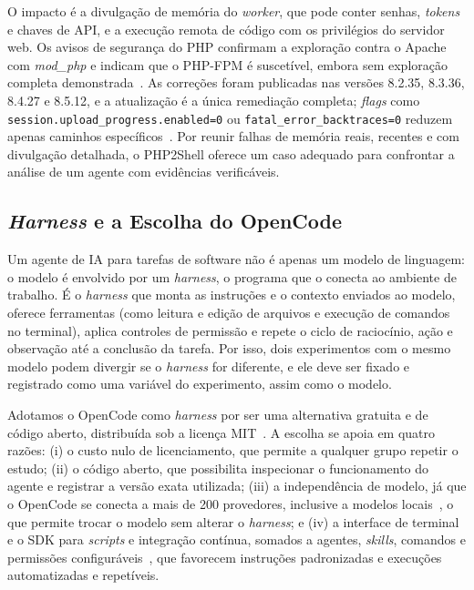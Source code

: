 \documentclass[12pt]{article}
\begin{document}
O impacto é a divulgação de memória do \textit{worker}, que pode conter senhas, \textit{tokens} e chaves de API, e a execução remota de código com os privilégios do servidor web. Os avisos de segurança do PHP confirmam a exploração contra o Apache com \textit{mod\_php} e indicam que o PHP-FPM é suscetível, embora sem exploração completa demonstrada~\cite{php2026ghsaw8hw, php2026ghsa6wmf}. As correções foram publicadas nas versões 8.2.35, 8.3.36, 8.4.27 e 8.5.12, e a atualização é a única remediação completa; \textit{flags} como \texttt{session.upload\_progress.enabled=0} ou \texttt{fatal\_error\_backtraces=0} reduzem apenas caminhos específicos~\cite{php2026ghsa6wmf}. Por reunir falhas de memória reais, recentes e com divulgação detalhada, o PHP2Shell oferece um caso adequado para confrontar a análise de um agente com evidências verificáveis.

\subsection{\textit{Harness} e a Escolha do OpenCode}
\label{sec:harness}

Um agente de IA para tarefas de software não é apenas um modelo de linguagem: o modelo é envolvido por um \textit{harness}, o programa que o conecta ao ambiente de trabalho. É o \textit{harness} que monta as instruções e o contexto enviados ao modelo, oferece ferramentas (como leitura e edição de arquivos e execução de comandos no terminal), aplica controles de permissão e repete o ciclo de raciocínio, ação e observação até a conclusão da tarefa. Por isso, dois experimentos com o mesmo modelo podem divergir se o \textit{harness} for diferente, e ele deve ser fixado e registrado como uma variável do experimento, assim como o modelo.

Adotamos o OpenCode como \textit{harness} por ser uma alternativa gratuita e de código aberto, distribuída sob a licença MIT~\cite{opencode2026}. A escolha se apoia em quatro razões: (i) o custo nulo de licenciamento, que permite a qualquer grupo repetir o estudo; (ii) o código aberto, que possibilita inspecionar o funcionamento do agente e registrar a versão exata utilizada; (iii) a independência de modelo, já que o OpenCode se conecta a mais de 200 provedores, inclusive a modelos locais~\cite{opencode2026}, o que permite trocar o modelo sem alterar o \textit{harness}; e (iv) a interface de terminal e o SDK para \textit{scripts} e integração contínua, somados a agentes, \textit{skills}, comandos e permissões configuráveis~\cite{opencode2026}, que favorecem instruções padronizadas e execuções automatizadas e repetíveis.
\end{document}
